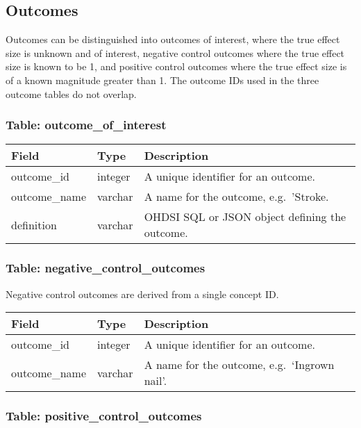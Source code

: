 \documentclass[
]{article}
\begin{document}
\hypertarget{outcomes}{%
\subsection{Outcomes}\label{outcomes}}

Outcomes can be distinguished into outcomes of interest, where the true
effect size is unknown and of interest, negative control outcomes where
the true effect size is known to be 1, and positive control outcomes
where the true effect size is of a known magnitude greater than 1. The
outcome IDs used in the three outcome tables do not overlap.

\hypertarget{table-outcome_of_interest}{%
\subsubsection{Table:
outcome\_of\_interest}\label{table-outcome_of_interest}}

\begin{longtable}[]{@{}lll@{}}
\toprule
Field & Type & Description\tabularnewline
\midrule
\endhead
outcome\_id & integer & A unique identifier for an
outcome.\tabularnewline
outcome\_name & varchar & A name for the outcome,
e.g.~'Stroke.\tabularnewline
definition & varchar & OHDSI SQL or JSON object defining the
outcome.\tabularnewline
\bottomrule
\end{longtable}

\hypertarget{table-negative_control_outcomes}{%
\subsubsection{Table:
negative\_control\_outcomes}\label{table-negative_control_outcomes}}

Negative control outcomes are derived from a single concept ID.

\begin{longtable}[]{@{}lll@{}}
\toprule
Field & Type & Description\tabularnewline
\midrule
\endhead
outcome\_id & integer & A unique identifier for an
outcome.\tabularnewline
outcome\_name & varchar & A name for the outcome, e.g.~`Ingrown
nail'.\tabularnewline
\bottomrule
\end{longtable}

\hypertarget{table-positive_control_outcomes}{%
\subsubsection{Table:
positive\_control\_outcomes}\label{table-positive_control_outcomes}}
\end{document}
